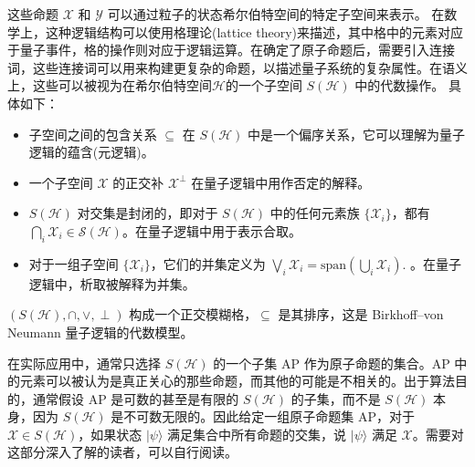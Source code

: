 这些命题 \( \mathcal{X} \) 和 \( \mathcal{Y} \) 可以通过粒子的状态希尔伯特空间的特定子空间来表示。
在数学上，这种逻辑结构可以使用格理论(lattice theory)来描述，其中格中的元素对应于量子事件，格的操作则对应于逻辑运算。在确定了原子命题后，需要引入连接词，这些连接词可以用来构建更复杂的命题，以描述量子系统的复杂属性。在语义上，这些可以被视为在希尔伯特空间$\mathcal{H}$的一个子空间 \(S(\mathcal{H})\) 中的代数操作。
具体如下：
\begin{itemize}
    \item 子空间之间的包含关系 \( \subseteq \) 在 \(S(\mathcal{H})\) 中是一个偏序关系，它可以理解为量子逻辑的蕴含(元逻辑)。
    \item 一个子空间 \( \mathcal{X} \) 的正交补 \( \mathcal{X}^\perp \) 在量子逻辑中用作否定的解释。
    \item \(S(\mathcal{H})\) 对交集是封闭的，即对于 \(S(\mathcal{H})\) 中的任何元素族 \( \{\mathcal{X}_i\} \)，都有$\bigcap_{i} \mathcal{X}_{i} \in \mathcal{S}(\mathcal{H})$。在量子逻辑中用于表示合取。
    \item 对于一组子空间 \(\{\mathcal{X}_i\}\)，它们的并集定义为
    \(
    \bigvee_i \mathcal{X}_i = \text{span} \left( \bigcup_i \mathcal{X}_i \right).
    \)
    。在量子逻辑中，析取被解释为并集。
\end{itemize}

\( (S(\mathcal{H}), \cap, \vee, \perp) \) 构成一个正交模糊格，\( \subseteq \) 是其排序，这是 Birkhoff–von Neumann 量子逻辑的代数模型。

在实际应用中，通常只选择 \( S(\mathcal{H}) \) 的一个子集 AP 作为原子命题的集合。AP 中的元素可以被认为是真正关心的那些命题，而其他的可能是不相关的。出于算法目的，通常假设 AP 是可数的甚至是有限的 \( S(\mathcal{H}) \) 的子集，而不是 \( S(\mathcal{H}) \) 本身，因为 \( S(\mathcal{H}) \) 是不可数无限的。因此给定一组原子命题集 AP，对于 \( \mathcal{X} \in S(\mathcal{H}) \)，如果状态 \(|\psi\rangle\) 满足集合中所有命题的交集，说 \(|\psi\rangle\) 满足 \(\mathcal{X}\)。需要对这部分深入了解的读者，可以自行阅读\citep{2021}。
